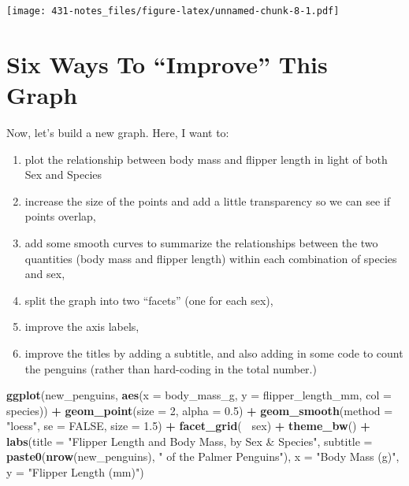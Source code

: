 \documentclass[
]{book}
\newenvironment{Shaded}{\begin{snugshade}}{\end{snugshade}}
\newcommand{\DataTypeTok}[1]{\textcolor[rgb]{0.13,0.29,0.53}{#1}}
\newcommand{\DecValTok}[1]{\textcolor[rgb]{0.00,0.00,0.81}{#1}}
\newcommand{\FloatTok}[1]{\textcolor[rgb]{0.00,0.00,0.81}{#1}}
\newcommand{\KeywordTok}[1]{\textcolor[rgb]{0.13,0.29,0.53}{\textbf{#1}}}
\newcommand{\NormalTok}[1]{#1}
\newcommand{\OperatorTok}[1]{\textcolor[rgb]{0.81,0.36,0.00}{\textbf{#1}}}
\newcommand{\OtherTok}[1]{\textcolor[rgb]{0.56,0.35,0.01}{#1}}
\newcommand{\StringTok}[1]{\textcolor[rgb]{0.31,0.60,0.02}{#1}}
\providecommand{\tightlist}{%
  \setlength{\itemsep}{0pt}\setlength{\parskip}{0pt}}
\begin{document}
\texttt{[image: 431-notes\_files/figure-latex/unnamed-chunk-8-1.pdf]}

\hypertarget{six-ways-to-improve-this-graph}{%
\section{Six Ways To ``Improve'' This Graph}\label{six-ways-to-improve-this-graph}}

Now, let's build a new graph. Here, I want to:

\begin{enumerate}
\def\labelenumi{\arabic{enumi}.}
\tightlist
\item
  plot the relationship between body mass and flipper length in light of both Sex and Species
\item
  increase the size of the points and add a little transparency so we can see if points overlap,
\item
  add some smooth curves to summarize the relationships between the two quantities (body mass and flipper length) within each combination of species and sex,
\item
  split the graph into two ``facets'' (one for each sex),
\item
  improve the axis labels,
\item
  improve the titles by adding a subtitle, and also adding in some code to count the penguins (rather than hard-coding in the total number.)
\end{enumerate}

\begin{Shaded}
\begin{Highlighting}[]
\KeywordTok{ggplot}\NormalTok{(new_penguins, }\KeywordTok{aes}\NormalTok{(}\DataTypeTok{x =}\NormalTok{ body_mass_g, }\DataTypeTok{y =}\NormalTok{ flipper_length_mm, }
                         \DataTypeTok{col =}\NormalTok{ species)) }\OperatorTok{+}
\StringTok{    }\KeywordTok{geom_point}\NormalTok{(}\DataTypeTok{size =} \DecValTok{2}\NormalTok{, }\DataTypeTok{alpha =} \FloatTok{0.5}\NormalTok{) }\OperatorTok{+}\StringTok{ }
\StringTok{    }\KeywordTok{geom_smooth}\NormalTok{(}\DataTypeTok{method =} \StringTok{"loess"}\NormalTok{, }\DataTypeTok{se =} \OtherTok{FALSE}\NormalTok{, }\DataTypeTok{size =} \FloatTok{1.5}\NormalTok{) }\OperatorTok{+}
\StringTok{    }\KeywordTok{facet_grid}\NormalTok{(}\OperatorTok{~}\StringTok{ }\NormalTok{sex) }\OperatorTok{+}
\StringTok{    }\KeywordTok{theme_bw}\NormalTok{() }\OperatorTok{+}\StringTok{ }
\StringTok{    }\KeywordTok{labs}\NormalTok{(}\DataTypeTok{title =} \StringTok{"Flipper Length and Body Mass, by Sex & Species"}\NormalTok{,}
         \DataTypeTok{subtitle =} \KeywordTok{paste0}\NormalTok{(}\KeywordTok{nrow}\NormalTok{(new_penguins), }\StringTok{" of the Palmer Penguins"}\NormalTok{),}
         \DataTypeTok{x =} \StringTok{"Body Mass (g)"}\NormalTok{, }
         \DataTypeTok{y =} \StringTok{"Flipper Length (mm)"}\NormalTok{)}
\end{Highlighting}
\end{Shaded}
\end{document}
